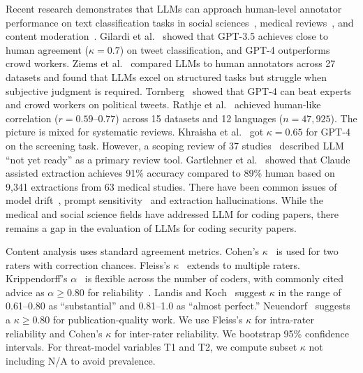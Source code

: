 \documentclass[conference,compsoc]{IEEEtran}
\begin{document}
Recent research demonstrates that LLMs can approach human-level annotator performance on text classification tasks in social sciences~\cite{gilardi2023chatgpt,tornberg2024chatgpt}, medical reviews~\cite{gartlehner2025ai}, and content moderation~\cite{rathje2024gpt}. Gilardi et al.~\cite{gilardi2023chatgpt} showed that GPT-3.5 achieves close to human agreement ($\kappa = 0.7$) on tweet classification, and GPT-4 outperforms crowd workers. Ziems et al.~\cite{ziems2024can} compared LLMs to human annotators across 27 datasets and found that LLMs excel on structured tasks but struggle when subjective judgment is required. Tornberg~\cite{tornberg2024chatgpt} showed that GPT-4 can beat experts and crowd workers on political tweets. Rathje et al.~\cite{rathje2024gpt} achieved human-like correlation ($r = 0.59$--$0.77$) across 15 datasets and 12 languages ($n = 47{,}925$). The picture is mixed for systematic reviews. Khraisha et al.~\cite{khraisha2024llm} got $\kappa = 0.65$ for GPT-4 on the screening task. However, a scoping review of 37 studies~\cite{lieberum2024llm} described LLM ``not yet ready'' as a primary review tool. Gartlehner et al.~\cite{gartlehner2025ai} showed that Claude assisted extraction achieves 91\% accuracy compared to 89\% human based on 9,341 extractions from 63 medical studies. There have been common issues of model drift~\cite{chen2023chatgpt}, prompt sensitivity~\cite{sclar2023quantifying} and extraction hallucinations. While the medical and social science fields have addressed LLM for coding papers, there remains a gap in the evaluation of LLMs for coding security papers.

Content analysis uses standard agreement metrics. Cohen's $\kappa$~\cite{cohen1960coefficient} is used for two raters with correction chances. Fleiss's $\kappa$~\cite{fleiss1971measuring} extends to multiple raters. Krippendorff's $\alpha$~\cite{krippendorff2004reliability} is flexible across the number of coders, with commonly cited advice as $\alpha \geq 0.80$ for reliability~\cite{hayes2007answering}. Landis and Koch~\cite{landis1977measurement} suggest $\kappa$ in the range of 0.61--0.80 as ``substantial'' and 0.81--1.0 as ``almost perfect.'' Neuendorf~\cite{neuendorf2017content} suggests a $\kappa \geq 0.80$ for publication-quality work. We use Fleiss's $\kappa$ for intra-rater reliability and Cohen's $\kappa$ for inter-rater reliability. We bootstrap 95\% confidence intervals. For threat-model variables T1 and T2, we compute subset $\kappa$ not including N/A to avoid prevalence.
\end{document}
